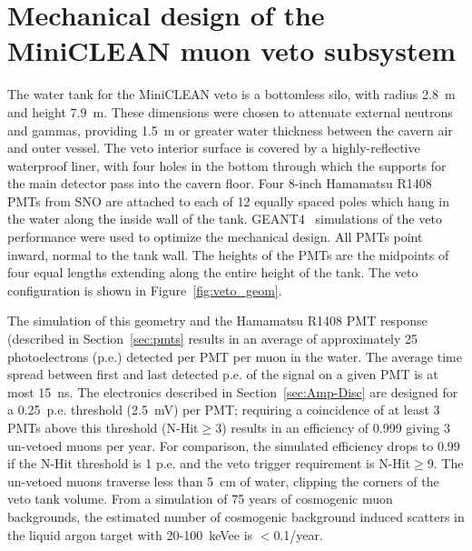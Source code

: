 \documentclass[review,number,sort&compress]{elsarticle}
\begin{document}
\section{Mechanical design of the MiniCLEAN muon veto subsystem}
\label{sec:subsystem_design}
%
The water tank for the MiniCLEAN veto is a bottomless silo, with
radius 2.8~m and height 7.9~m. These dimensions were chosen to
attenuate external neutrons and gammas, providing 1.5~m or greater
water thickness between the cavern air and outer vessel. The veto
interior surface is covered by a highly-reflective waterproof liner,
with four holes in the bottom through which the supports for the main
detector pass into the cavern floor. Four 8-inch Hamamatsu R1408 PMTs
from SNO are attached to each of 12 equally spaced poles which hang in
the water along the inside wall of the tank. GEANT4~\cite{ref:geant4}
simulations of the veto performance were used to optimize the
mechanical design. All PMTs point inward, normal to the tank wall. The
heights of the PMTs are the midpoints of four equal lengths extending
along the entire height of the tank. The veto configuration is shown
in Figure~\ref{fig:veto_geom}.

The simulation of this geometry and the Hamamatsu R1408 PMT response (described
in Section~\ref{sec:pmts} results in an average of approximately 25
photoelectrons (p.e.) detected per PMT per muon in the water. The
average time spread between first and last detected p.e. of the signal
on a given PMT is at most 15~ns. The electronics described in
Section~\ref{sec:Amp-Disc} are designed for a 0.25~p.e. threshold (2.5~mV)
per PMT; requiring a coincidence of at least 3 PMTs above this
threshold (N-Hit$\ge$3) results in an efficiency of 0.999 giving 3
un-vetoed muons per year. For comparison, the simulated efficiency
drops to 0.99 if the N-Hit threshold is 1 p.e. and the veto trigger
requirement is N-Hit$\ge$9. The un-vetoed muons traverse less than 5~cm
of water, clipping the corners of the veto tank volume. From a
simulation of 75 years of cosmogenic muon backgrounds, the estimated
number of cosmogenic background induced scatters in the liquid argon
target with 20-100~keVee is $<$0.1/year.
\end{document}
